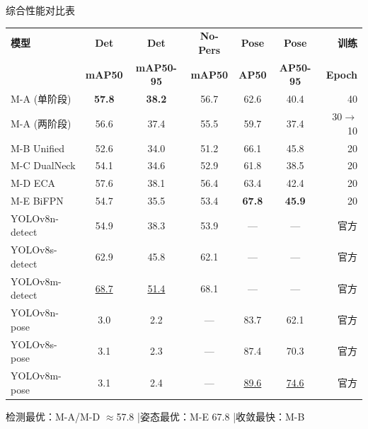 \documentclass[aspectratio=169, 10pt]{ctexbeamer}
\begin{document}
\begin{frame}{综合性能对比表}
  \centering
  \scriptsize
  \begin{tabular}{lcccccr}
    \toprule
    \rowcolor{blue!10}
    \textbf{模型} & \textbf{Det} & \textbf{Det} & \textbf{No-Pers} & \textbf{Pose} & \textbf{Pose} & \textbf{训练} \\
    \rowcolor{blue!10}
    & \textbf{mAP50} & \textbf{mAP50-95} & \textbf{mAP50} & \textbf{AP50} & \textbf{AP50-95} & \textbf{Epoch} \\
    \midrule
    M-A (单阶段) & \textbf{57.8} & \textbf{38.2} & 56.7 & 62.6 & 40.4 & 40 \\
    M-A (两阶段) & 56.6 & 37.4 & 55.5 & 59.7 & 37.4 & 30$\rightarrow$10 \\
    M-B Unified   & 52.6 & 34.0 & 51.2 & 66.1 & 45.8 & 20 \\
    M-C DualNeck  & 54.1 & 34.6 & 52.9 & 61.8 & 38.5 & 20 \\
    M-D ECA       & 57.6 & 38.1 & 56.4 & 63.4 & 42.4 & 20 \\
    M-E BiFPN     & 54.7 & 35.5 & 53.4 & \textbf{67.8} & \textbf{45.9} & 20 \\
    \midrule
    YOLOv8n-detect & 54.9 & 38.3 & 53.9 & --- & --- & 官方 \\
    YOLOv8s-detect & 62.9 & 45.8 & 62.1 & --- & --- & 官方 \\
    YOLOv8m-detect & \underline{68.7} & \underline{51.4} & 68.1 & --- & --- & 官方 \\
    YOLOv8n-pose   & 3.0 & 2.2 & --- & 83.7 & 62.1 & 官方 \\
    YOLOv8s-pose   & 3.1 & 2.3 & --- & 87.4 & 70.3 & 官方 \\
    YOLOv8m-pose   & 3.1 & 2.4 & --- & \underline{89.6} & \underline{74.6} & 官方 \\
    \bottomrule
  \end{tabular}
  \vspace{0.15cm}

  \small 检测最优：M-A/M-D $\approx$57.8 \quad|\quad 姿态最优：M-E 67.8 \quad|\quad 收敛最快：M-B
\end{frame}
\end{document}
